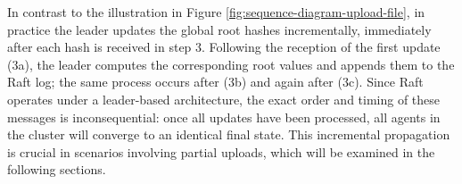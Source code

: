 In contrast to the illustration in Figure \ref{fig:sequence-diagram-upload-file}, in practice the leader updates the global root hashes incrementally, immediately after each hash is received in step 3. Following the reception of the first update (3a), the leader computes the corresponding root values and appends them to the Raft log; the same process occurs after (3b) and again after (3c). Since Raft operates under a leader-based architecture, the exact order and timing of these messages is inconsequential: once all updates have been processed, all agents in the cluster will converge to an identical final state. This incremental propagation is crucial in scenarios involving partial uploads, which will be examined in the following sections.

\setcounter{enumi}{0}

\begin{figure}[!ht]
\centering
{}
\end{figure}

